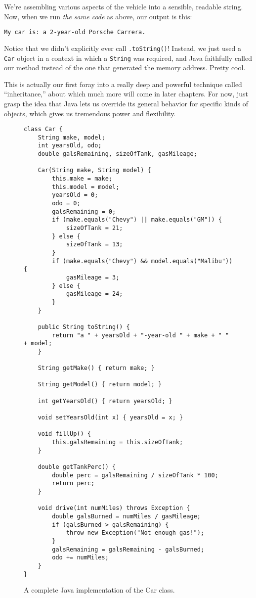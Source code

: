 We're assembling various aspects of the vehicle into a sensible, readable
string. Now, when we run \textit{the same code} as above, our output is this:

\begin{verbatim}
My car is: a 2-year-old Porsche Carrera.
\end{verbatim}

Notice that we didn't explicitly ever call \texttt{.toString()}! Instead, we
just used a \texttt{Car} object in a context in which a \texttt{String} was
required, and Java faithfully called our method instead of the one that
generated the memory address. Pretty cool.

This is actually our first foray into a really deep and powerful technique
called ``inheritance,'' about which much more will come in later chapters. For
now, just grasp the idea that Java lets us override its general behavior for
specific kinds of objects, which gives us tremendous power and flexibility.

\begin{figure}
\begin{Verbatim}[fontsize=\scriptsize,frame=single]
class Car {
    String make, model;
    int yearsOld, odo;
    double galsRemaining, sizeOfTank, gasMileage;

    Car(String make, String model) {
        this.make = make;
        this.model = model;
        yearsOld = 0;
        odo = 0;
        galsRemaining = 0;
        if (make.equals("Chevy") || make.equals("GM")) {
            sizeOfTank = 21;
        } else {
            sizeOfTank = 13;
        }
        if (make.equals("Chevy") && model.equals("Malibu")) {
            gasMileage = 3;
        } else {
            gasMileage = 24;
        }
    }

    public String toString() {
        return "a " + yearsOld + "-year-old " + make + " " + model;
    }

    String getMake() { return make; }

    String getModel() { return model; }

    int getYearsOld() { return yearsOld; }

    void setYearsOld(int x) { yearsOld = x; }

    void fillUp() {
        this.galsRemaining = this.sizeOfTank;
    }

    double getTankPerc() {
        double perc = galsRemaining / sizeOfTank * 100;
        return perc;
    }

    void drive(int numMiles) throws Exception {
        double galsBurned = numMiles / gasMileage;
        if (galsBurned > galsRemaining) {
            throw new Exception("Not enough gas!");
        }
        galsRemaining = galsRemaining - galsBurned;
        odo += numMiles;
    }
}
\end{Verbatim}
\caption{A complete Java implementation of the Car class.}
\label{fig:carClassCode}
\end{figure}



